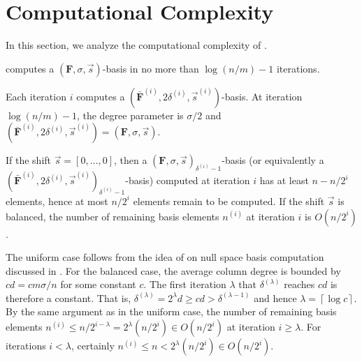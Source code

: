 
\section{Computational Complexity}

\label{sec:complexity}

In this section, we analyze the computational complexity of .
 
\begin{lem}
 computes a $\left(\mathbf{F},\sigma,\vec{s}\right)$-basis
in no more than $\log\left(n/m\right)-1$ iterations.\end{lem}
\begin{pf}
Each iteration $i$ computes a $(\bar{\mathbf{F}}^{\left(i\right)},2\delta^{\left(i\right)},\vec{s}^{\left(i\right)})$-basis.
At iteration $\log\left(n/m\right)-1$, the degree parameter is $\sigma/2$
and $(\bar{\mathbf{F}}^{\left(i\right)},2\delta^{\left(i\right)},\vec{s}^{\left(i\right)})=\left(\mathbf{F},\sigma,\vec{s}\right)$.\end{pf}
\begin{lem}
\label{lem:remainingNumberElements}If the shift $\vec{s}=\left[0,\dots,0\right]$,
then a $\left(\mathbf{F},\sigma,\vec{s}\right)_{\delta^{\left(i\right)}-1}$-basis
(or equivalently a $(\bar{\mathbf{F}}^{\left(i\right)},2\delta^{\left(i\right)},\vec{s}^{\left(i\right)})_{\delta^{\left(i\right)}-1}$-basis)
computed at iteration $i$ has at least $n-n/2^{i}$ elements, hence
at most $n/2^{i}$ elements remain to be computed. If the shift $\vec{s}$
is balanced, the number of remaining basis elements $n^{\left(i\right)}$
at iteration $i$ is $O(n/2^{i})$.\end{lem}
\begin{pf}
The uniform case follows from the idea of \citet{storjohann-villard:2005}
on null space basis computation discussed in .
For the balanced case, the average column degree is bounded by $cd=cm\sigma/n$
for some constant $c$. The first iteration $\lambda$ that $\delta^{\left(\lambda\right)}$
reaches $cd$ is therefore a constant. That is, $\delta^{\left(\lambda\right)}=2^{\lambda}d\ge cd>\delta^{\left(\lambda-1\right)}$
and hence $\lambda=\left\lceil \log c\right\rceil $. By the same
argument as in the uniform case, the number of remaining basis elements
$n^{\left(i\right)}\le n/2^{i-\lambda}=2^{\lambda}(n/2^{i})\in O(n/2^{i})$
at iteration $i\ge\lambda$. For iterations $i<\lambda$, certainly
$n^{\left(i\right)}\le n<2^{\lambda}(n/2^{i})\in O(n/2^{i})$.\end{pf}
